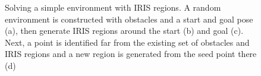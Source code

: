 \begin{figure}[t]
	\hfill
	\hfill
	\hfill
	\hfill
	\hfill
	\caption{\label{fig: figs-4a}Solving a simple environment with IRIS regions. A random environment is constructed with obstacles and a start and goal pose (a), then generate IRIS regions around the start (b) and goal (c). Next, a point is identified far from the existing set of obstacles and IRIS regions and a new region is generated from the seed point there (d)}
\end{figure}
